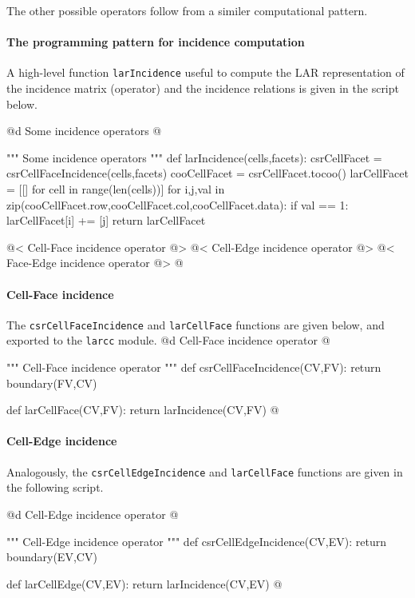 \documentclass[11pt,oneside]{article}	%
\begin{document}
The other possible operators follow from a similer computational pattern.

\paragraph{The programming pattern for incidence computation}

A high-level function \texttt{larIncidence} useful to compute the LAR representation of the incidence matrix (operator) and the incidence relations is given in the script below.

@d Some incidence operators
@{""" Some incidence operators """
def larIncidence(cells,facets):
	csrCellFacet = csrCellFaceIncidence(cells,facets)
	cooCellFacet = csrCellFacet.tocoo()
	larCellFacet = [[] for cell in range(len(cells))]
	for i,j,val in zip(cooCellFacet.row,cooCellFacet.col,cooCellFacet.data):
		if val == 1: larCellFacet[i] += [j]
	return larCellFacet

@< Cell-Face incidence operator @>
@< Cell-Edge incidence operator @>
@< Face-Edge incidence operator @>
@}


\paragraph{Cell-Face incidence}
The \texttt{csrCellFaceIncidence} and \texttt{larCellFace} functions are given below, and exported to the \texttt{larcc} module.
@d Cell-Face incidence operator
@{""" Cell-Face incidence operator """
def csrCellFaceIncidence(CV,FV):
	return boundary(FV,CV)

def larCellFace(CV,FV):
	return larIncidence(CV,FV)
@}

\paragraph{Cell-Edge incidence}
Analogously, the \texttt{csrCellEdgeIncidence} and \texttt{larCellFace} functions are given in the following script.

@d Cell-Edge incidence operator
@{""" Cell-Edge incidence operator """
def csrCellEdgeIncidence(CV,EV):
	 return boundary(EV,CV)

def larCellEdge(CV,EV):
	return larIncidence(CV,EV)
@}
\end{document}

